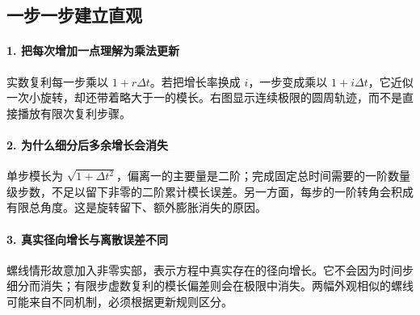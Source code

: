\subsection*{一步一步建立直观}

\paragraph{1. 把每次增加一点理解为乘法更新}

实数复利每一步乘以 $1+r\Delta t$。若把增长率换成 $i$，一步变成乘以 $1+i\Delta t$，它近似一次小旋转，却还带着略大于一的模长。右图显示连续极限的圆周轨迹，而不是直接播放有限次复利步骤。



\paragraph{2. 为什么细分后多余增长会消失}

单步模长为 $\sqrt{1+\Delta t^2}$，偏离一的主要量是二阶；完成固定总时间需要的一阶数量级步数，不足以留下非零的二阶累计模长误差。另一方面，每步的一阶转角会积成有限总角度。这是旋转留下、额外膨胀消失的原因。



\paragraph{3. 真实径向增长与离散误差不同}

螺线情形故意加入非零实部，表示方程中真实存在的径向增长。它不会因为时间步细分而消失；有限步虚数复利的模长偏差则会在极限中消失。两幅外观相似的螺线可能来自不同机制，必须根据更新规则区分。
